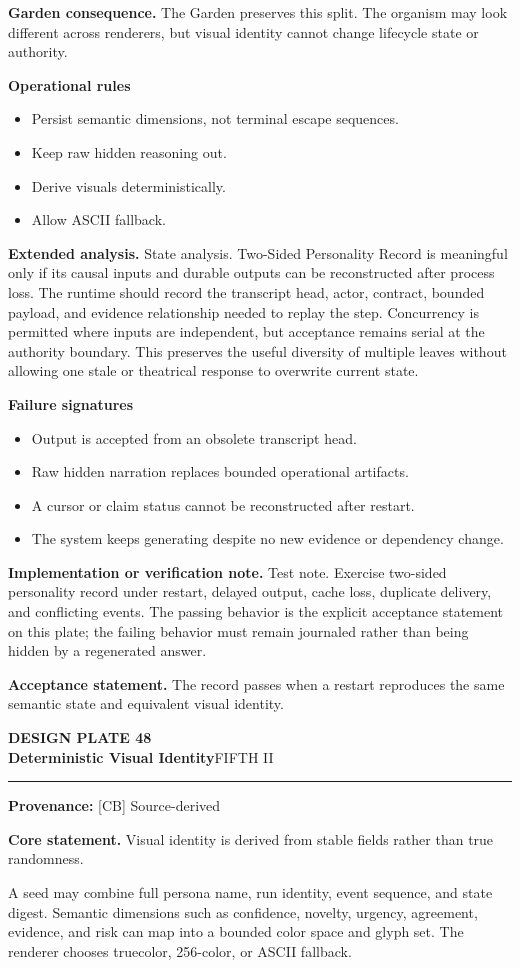 \documentclass[10pt,letterpaper,oneside]{article}
\newcommand{\prov}[1]{\textcolor{gardenBlue}{\sffamily\footnotesize\textbf{Provenance:} #1}}
\newcommand{\platetitle}[3]{%
  \begin{minipage}[t][0.54in][t]{\textwidth}
  {\sffamily\bfseries\color{gardenDeep}\fontsize{9}{10}\selectfont DESIGN PLATE #1}\\[-1pt]
  {\sffamily\bfseries\color{gardenInk}\fontsize{16.5}{18}\selectfont #2}\hfill{\sffamily\color{gardenGreen}\large #3}
  \end{minipage}\vspace{-2pt}\hrule\vspace{5pt}}
\begin{document}
\textbf{Garden consequence.} The Garden preserves this split. The organism may look different across renderers, but visual identity cannot change lifecycle state or authority.

\textbf{Operational rules}
\begin{itemize}
\item Persist semantic dimensions, not terminal escape sequences.
\item Keep raw hidden reasoning out.
\item Derive visuals deterministically.
\item Allow ASCII fallback.
\end{itemize}
\textbf{Extended analysis.} State analysis. Two-Sided Personality Record is meaningful only if its causal inputs and durable outputs can be reconstructed after process loss. The runtime should record the transcript head, actor, contract, bounded payload, and evidence relationship needed to replay the step. Concurrency is permitted where inputs are independent, but acceptance remains serial at the authority boundary. This preserves the useful diversity of multiple leaves without allowing one stale or theatrical response to overwrite current state.

\textbf{Failure signatures}
\begin{itemize}
\item Output is accepted from an obsolete transcript head.
\item Raw hidden narration replaces bounded operational artifacts.
\item A cursor or claim status cannot be reconstructed after restart.
\item The system keeps generating despite no new evidence or dependency change.
\end{itemize}
\textbf{Implementation or verification note.} Test note. Exercise two-sided personality record under restart, delayed output, cache loss, duplicate delivery, and conflicting events. The passing behavior is the explicit acceptance statement on this plate; the failing behavior must remain journaled rather than being hidden by a regenerated answer.

\begin{acceptbox}
\textbf{Acceptance statement.} The record passes when a restart reproduces the same semantic state and equivalent visual identity.
\end{acceptbox}
\newpage
\platetitle{48}{Deterministic Visual Identity}{FIFTH II}
\prov{[CB] Source-derived}
\fontsize{8.85}{10.45}\selectfont
\begin{corebox}
\textbf{Core statement.} Visual identity is derived from stable fields rather than true randomness.
\end{corebox}
A seed may combine full persona name, run identity, event sequence, and state digest. Semantic dimensions such as confidence, novelty, urgency, agreement, evidence, and risk can map into a bounded color space and glyph set. The renderer chooses truecolor, 256-color, or ASCII fallback.
\end{document}
